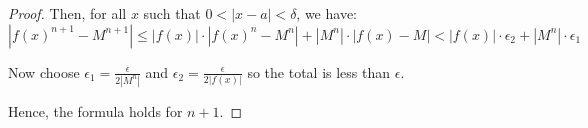 \documentclass{article}
\begin{document}
\begin{proof}
		Then, for all \( x \) such that \( 0 < |x - a| < \delta \), we have:
		\[
		|f(x)^{n+1} - M^{n+1}| 
		\leq |f(x)| \cdot |f(x)^n - M^n| + |M^n| \cdot |f(x) - M|
		< |f(x)| \cdot \epsilon_2 + |M^n| \cdot \epsilon_1
		\]
		
		Now choose \( \epsilon_1 = \frac{\epsilon}{2|M^n|} \)  
		and \( \epsilon_2 = \frac{\epsilon}{2|f(x)|} \)  
		so the total is less than \( \epsilon \).
		
		Hence, the formula holds for \( n+1 \).
		
		
		
		
		
		
		
		
		
		
		
		
		
		
		
		
		
		
		
		
		
		
		
		
		
		
		
		
		
		
		
		
	\end{proof}
	
\end{document}
